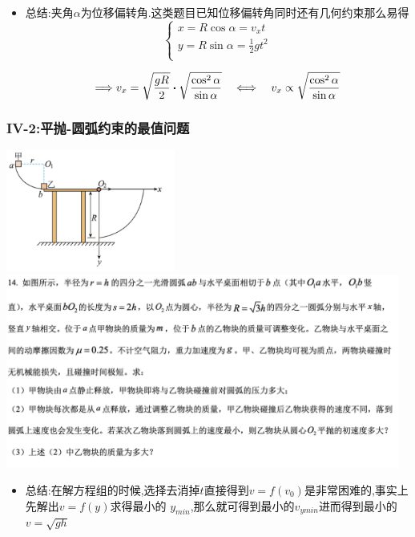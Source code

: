 \documentclass{article}
\begin{document}
\begin{itemize}
    \item 总结:夹角$\alpha$为位移偏转角.这类题目已知位移偏转角同时还有几何约束那么易得
          $$
              \begin{cases}
                  x = R \cos{\alpha} = v_{x} t             \\
                  y = R \sin{\alpha} = \frac{1}{2} g t^{2} \\
              \end{cases}
          $$

          $$
              \lra v_{x} = \sqrt{\frac{gR}{2}} \vdot \sqrt{\frac{\cos^{2}{\alpha}}{\sin{\alpha}}} \quad  \llra \quad  v_{x}  \propto  \sqrt{\frac{\cos^{2}{\alpha}}{\sin{\alpha}}}
          $$

\end{itemize}

\vspace{2em}

\subsubsection{IV-2:平抛-圆弧约束的最值问题}
\includegraphics[width=15em,keepaspectratio]{./pictures/1.2-6.png}
\includegraphics[width=35em,keepaspectratio]{./pictures/1.2-7.png}

\begin{itemize}
    \item 总结:\quad 在解方程组的时候,选择去消掉$t$直接得到$v = f(v_{0})$是非常困难的,事实上先解出$v = f(y)$求得最小的
          $y_{min}$,那么就可得到最小的$v_{ymin}$进而得到最小的$v = \sqrt{gh}$
\end{itemize}
\end{document}
